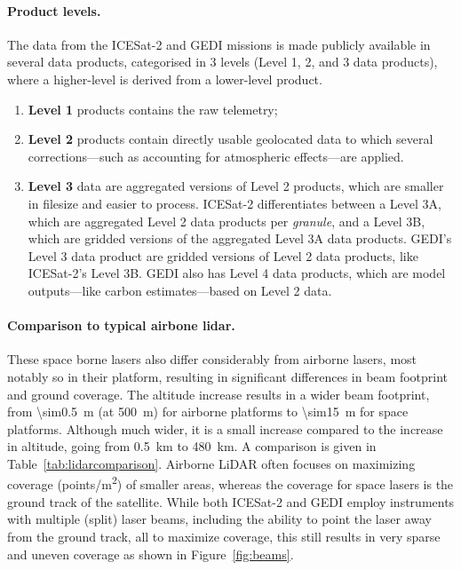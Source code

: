 %

\paragraph{Product levels.}
The data from the ICESat-2 and GEDI missions is made publicly available in several data products, categorised in 3 levels (Level 1, 2, and 3 data products), where a higher-level is derived from a lower-level product.
\begin{enumerate}
  \item \textbf{Level 1} products contains the raw telemetry;
  \item \textbf{Level 2} products contain directly usable geolocated data to which several corrections---such as accounting for atmospheric effects---are applied.
  \item \textbf{Level 3} data are aggregated versions of Level 2 products, which are smaller in filesize and easier to process.
  ICESat-2 differentiates between a Level 3A, which are aggregated Level 2 data products per \emph{granule}, and a Level 3B, which are gridded versions of the aggregated Level 3A data products.
  GEDI's Level 3 data product are gridded versions of Level 2 data products, like ICESat-2's Level 3B.
  GEDI also has Level 4 data products, which are model outputs---like carbon estimates---based on Level 2 data.
\end{enumerate}

\paragraph{Comparison to typical airbone lidar.}
These space borne lasers also differ considerably from airborne lasers, most notably so in their platform, resulting in significant differences in beam footprint and ground coverage.
The altitude increase results in a wider beam footprint, from \qty{\sim0.5}{m} (at \qty{500}{m}) for airborne platforms to \qty{\sim15}{m} for space platforms.
Although much wider, it is a small increase compared to the increase in altitude, going from \qty{0.5}{km} to \qty{480}{km}.
A comparison is given in Table~\ref{tab:lidarcomparison}.
Airborne LiDAR often focuses on maximizing coverage (\unit{points/m^2}) of smaller areas, whereas the coverage for space lasers is the ground track of the satellite.
While both ICESat-2 and GEDI employ instruments with multiple (split) laser beams, including the ability to point the laser away from the ground track, all to maximize coverage, this still results in very sparse and uneven coverage as shown in Figure~\ref{fig:beams}.



